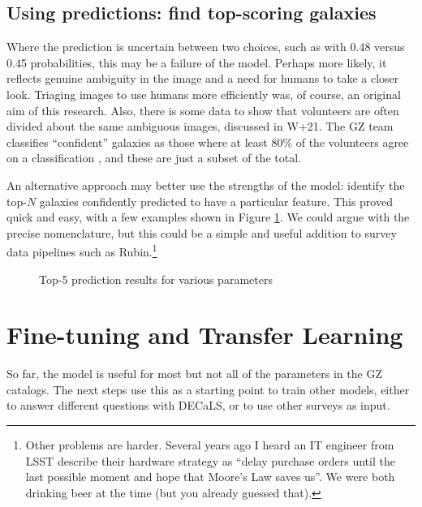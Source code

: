\documentclass[preprint]{aastex631}
\begin{document}
\newpage
\subsection{Using predictions: find top-scoring galaxies}

Where the prediction is uncertain between two choices, such as with 0.48 versus 0.45 probabilities, this may be a failure of the model. Perhaps more likely, it reflects genuine ambiguity in the image and a need for humans to take a closer look. Triaging images to use humans more efficiently was, of course, an original aim of this research. Also, there is some data to show that volunteers are often divided about the same ambiguous images, discussed in W+21. The GZ team classifies ``confident'' galaxies as those where at least 80\% of the volunteers agree on a classification \citep{2019MNRAS.484...93D}, and these are just a subset of the total.

An alternative approach may better use the strengths of the model: identify the top-$N$ galaxies confidently predicted to have a particular feature. This proved quick and easy, with a few examples shown in Figure \ref{fig:top5}. We could argue with the precise nomenclature, but this could be a simple and useful addition to survey data pipelines such as Rubin.\footnote{Other problems are harder. Several years ago I heard an IT engineer from LSST describe their hardware strategy as ``delay purchase orders until the last possible moment and hope that Moore's Law saves us''. We were both drinking beer at the time (but you already guessed that).}

\begin{figure}
	\caption{Top-5 prediction results for various parameters \label{fig:top5}}
\end{figure}


\section{Fine-tuning and Transfer Learning}

So far, the model is useful for most but not all of the parameters in the GZ catalogs. The next steps use this as a starting point to train other models, either to answer different questions with DECaLS, or to use other surveys as input.
\end{document}
